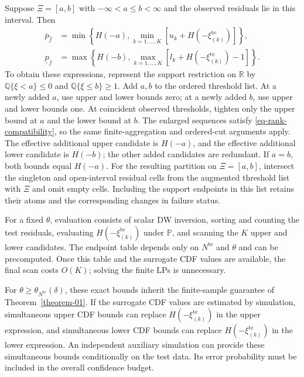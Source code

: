 \documentclass[review,11pt,3p,authoryear,nopreprintline]{elsarticle}
\begin{document}
\begin{remark}
  \label{rem-interval-support}
  Suppose $\Xi=[a,b]$ with $-\infty<a\le b<\infty$ and the observed residuals lie in this interval. Then
  \begin{align}
    \overline p_{\hat f}
    &=\min\left\{H(-a),\min_{k=1,\ldots,K}[u_k+H\left(-\xi_{(k)}^{\mathrm{te}}\right)]\right\},
    \label{eq-dw-interval-upper}\\
    \underline p_{\hat f}
    &=\max\left\{H(-b),\max_{k=1,\ldots,K}[l_k+H\left(-\xi_{(k)}^{\mathrm{te}}\right)-1]\right\}.
    \label{eq-dw-interval-lower}
  \end{align}
  To obtain these expressions, represent the support restriction on $\mathbb R$ by
  $\mathbb Q\{\xi<a\}\le0$ and $\mathbb Q\{\xi\le b\}\ge1$.
  Add $a,b$ to the ordered threshold list. At a newly added $a$, use upper and lower bounds zero; at a newly added $b$, use upper and lower bounds one. At coincident observed thresholds, tighten only the upper bound at $a$ and the lower bound at $b$. The enlarged sequences satisfy \eqref{eq-rank-compatibility}, so the same finite-aggregation and ordered-cut arguments apply. The effective additional upper candidate is $H(-a)$, and the effective additional lower candidate is $H(-b)$; the other added candidates are redundant. If $a=b$, both bounds equal $H(-a)$. For the resulting partition on $\Xi=[a,b]$, intersect the singleton and open-interval residual cells from the augmented threshold list with $\Xi$ and omit empty cells. Including the support endpoints in this list retains their atoms and the corresponding changes in failure status.
\end{remark}

For a fixed $\theta$, evaluation consists of scalar DW inversion, sorting and counting the test residuals, evaluating $H\left(-\xi_{(k)}^{\mathrm{te}}\right)$ under $\mathbb P$, and scanning the $K$ upper and lower candidates. The endpoint table depends only on $N^{\mathrm{te}}$ and $\theta$ and can be precomputed. Once this table and the surrogate CDF values are available, the final scan costs $O(K)$; solving the finite LPs is unnecessary.

For $\theta\ge\theta_{N^{\mathrm{te}}}(\delta)$, these exact bounds inherit the finite-sample guarantee of Theorem~\ref{theorem-01}. If the surrogate CDF values are estimated by simulation, simultaneous upper CDF bounds can replace $H\left(-\xi_{(k)}^{\mathrm{te}}\right)$ in the upper expression, and simultaneous lower CDF bounds can replace $H\left(-\xi_{(k)}^{\mathrm{te}}\right)$ in the lower expression. An independent auxiliary simulation can provide these simultaneous bounds conditionally on the test data. Its error probability must be included in the overall confidence budget.






\end{document}
